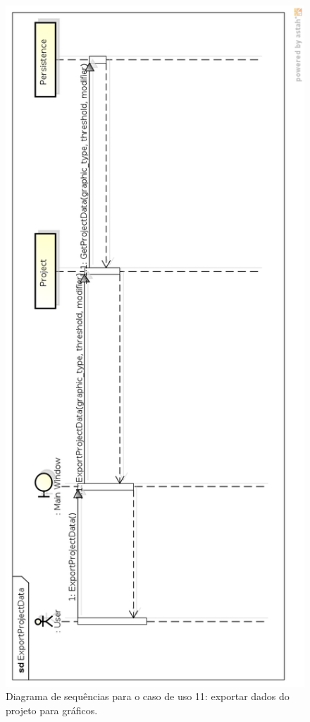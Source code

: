 \begin{figure}
\centering
\includegraphics[scale=0.43]{export-project-data}
\caption{Diagrama de sequências para o caso de uso 11: exportar dados do projeto para gráficos.}
\label{fig:export-project-data}
\end{figure}